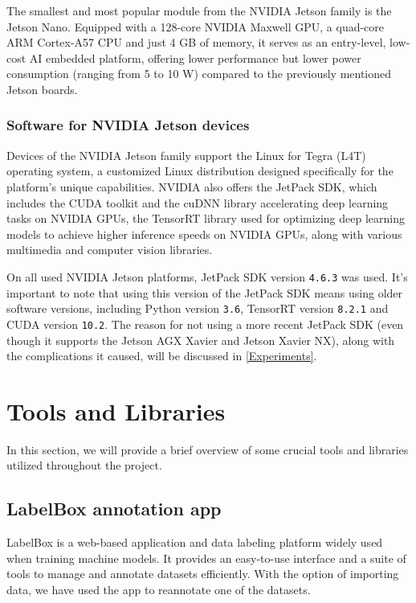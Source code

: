 The smallest and most popular module from the NVIDIA Jetson family is the Jetson
Nano. Equipped with a 128-core NVIDIA Maxwell GPU, a quad-core ARM Cortex-A57
CPU and just 4 GB of memory, it serves as an entry-level, low-cost AI embedded
platform, offering lower performance but lower power consumption (ranging from 5
to 10 W) compared to the previously mentioned Jetson boards.


\subsubsection{Software for NVIDIA Jetson devices}

Devices of the NVIDIA Jetson family support the Linux for Tegra (L4T) operating
system, a customized Linux distribution designed specifically for the platform's
unique capabilities. NVIDIA also offers the JetPack SDK, which includes the
CUDA toolkit and the cuDNN library accelerating deep learning tasks on NVIDIA
GPUs, the TensorRT library used for optimizing deep learning models to achieve
higher inference speeds on NVIDIA GPUs, along with various multimedia and
computer vision libraries.

On all used NVIDIA Jetson platforms, JetPack SDK version \texttt{4.6.3} was
used. It's important to note that using this version of the JetPack SDK means
using older software versions, including Python version \texttt{3.6}, TensorRT
version \texttt{8.2.1} and CUDA version \texttt{10.2}. The reason for not using
a more recent JetPack SDK (even though it supports the Jetson AGX Xavier and
Jetson Xavier NX), along with the complications it caused, will be discussed in
\autoref{Experiments}.


\section{Tools and Libraries}

In this section, we will provide a brief overview of some crucial tools and
libraries utilized throughout the project.


\subsection{LabelBox annotation app}

LabelBox \cite{LabelBox} is a web-based application and data labeling platform
widely used when training machine models. It provides an easy-to-use interface
and a suite of tools to manage and annotate datasets efficiently. With the
option of importing data, we have used the app to reannotate one of the
datasets.


